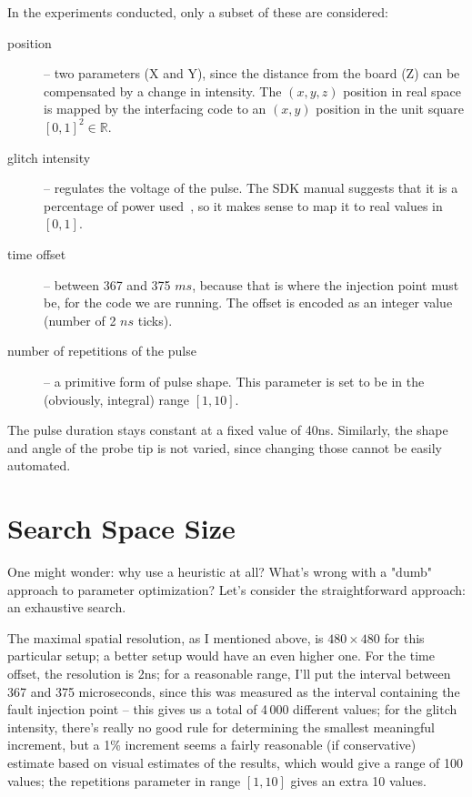 \documentclass[times, utf8, diplomski]{fer}
\begin{document}
In the experiments conducted, only a subset of these are considered:
\begin{description}
  \item[position] -- two parameters (X and Y), since the distance from the board
        (Z) can be compensated by a change in intensity. The $(x,y,z)$ position
        in real space is mapped by the interfacing code to an $(x,y)$ position
        in the unit square $[0,1]^2 \in \mathbb{R}$.
  \item[glitch intensity] -- regulates the voltage of the pulse. The SDK manual
        suggests that it is a percentage of power used~\cite{RiscureVCGmanual},
        so it makes sense to map it to real values in $[0,1]$.
  \item[time offset] -- between 367 and 375 $ms$, because that is where the
        injection point must be, for the code we are running. The offset is
        encoded as an integer value (number of 2 $ns$ ticks).
  \item[number of repetitions of the pulse] -- a primitive form of pulse shape.
        This parameter is set to be in the (obviously, integral) range $[1, 10]$.
\end{description}

The pulse duration stays constant at a fixed value of 40ns. Similarly, the shape
and angle of the probe tip is not varied, since changing those cannot be easily
automated.



\section{Search Space Size}\label{sec:search_space}
One might wonder: why use a heuristic at all? What's wrong with a "dumb"
approach to parameter optimization? Let's consider the straightforward
approach: an exhaustive search.

The maximal spatial resolution, as I mentioned above, is $480 \times 480$ for
this particular setup; a better setup would have an even higher one. For the
time offset, the resolution is 2ns; for a reasonable range, I'll put the
interval between 367 and 375 microseconds, since this was measured as the
interval containing the fault injection point -- this gives us a total of
4\,000 different values; for the glitch intensity, there's really no good rule
for determining the smallest meaningful increment, but a 1\% increment seems
a fairly reasonable (if conservative) estimate based on visual estimates of
the results, which would give a range of 100 values; the repetitions parameter
in range $[1,10]$ gives an extra 10 values.
\end{document}
